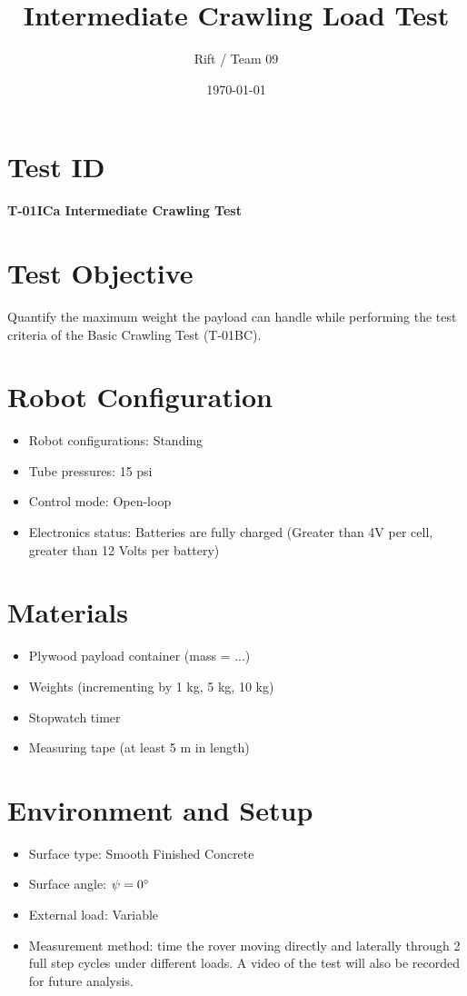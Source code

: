 \documentclass[11pt]{article}
\title{Intermediate Crawling Load Test}
\author{Rift / Team 09}
\date{\today}
\begin{document}
\maketitle

\section*{Test ID}
\textbf{T-01ICa Intermediate Crawling Test}

\section*{Test Objective}
Quantify the maximum weight the payload can handle while performing the test criteria of the Basic Crawling Test (T-01BC). 

\section*{Robot Configuration}
\begin{itemize}[noitemsep]
    \item Robot configurations: Standing
    \item Tube pressures: 15 psi
    \item Control mode: Open-loop
    \item Electronics status: Batteries are fully charged (Greater than 4V per cell, greater than 12 Volts per battery)
\end{itemize}

\section*{Materials}
\begin{itemize}[noitemsep]
    \item Plywood payload container (mass = ...)
    \item Weights (incrementing by 1 kg, 5 kg, 10 kg)
    \item Stopwatch timer
    \item Measuring tape (at least 5 m in length)
    
\end{itemize}

\section*{Environment and Setup}
\begin{itemize}[noitemsep]
    \item Surface type: Smooth Finished Concrete
    \item Surface angle: $\psi = 0 {\degree} $
    \item External load: Variable
    \item Measurement method: time the rover moving directly and laterally through 2 full step cycles under different loads. A video of the test will also be recorded for future analysis.
\end{itemize}
\end{document}
